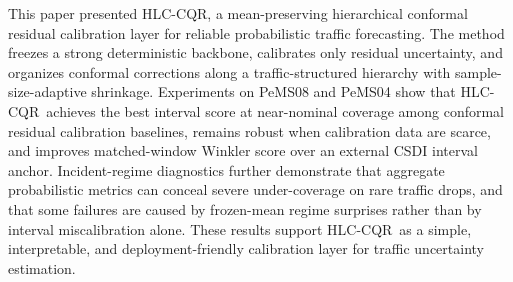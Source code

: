 \documentclass[letterpaper,journal]{IEEEtran}
\newcommand{\hlc}{HLC-CQR}
\begin{document}
This paper presented \hlc, a mean-preserving hierarchical conformal residual calibration layer for reliable probabilistic traffic forecasting. The method freezes a strong deterministic backbone, calibrates only residual uncertainty, and organizes conformal corrections along a traffic-structured hierarchy with sample-size-adaptive shrinkage. Experiments on PeMS08 and PeMS04 show that \hlc\ achieves the best interval score at near-nominal coverage among conformal residual calibration baselines, remains robust when calibration data are scarce, and improves matched-window Winkler score over an external CSDI interval anchor. Incident-regime diagnostics further demonstrate that aggregate probabilistic metrics can conceal severe under-coverage on rare traffic drops, and that some failures are caused by frozen-mean regime surprises rather than by interval miscalibration alone. These results support \hlc\ as a simple, interpretable, and deployment-friendly calibration layer for traffic uncertainty estimation.



\end{document}
